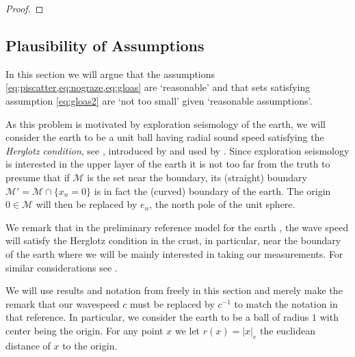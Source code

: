 \documentclass[
	fontsize=11pt, 
	twoside=false, 
	abstract=true, 
	a4paper,
]{scrartcl}
\newcommand{\dd}{\mathrm{d}}
\newcommand{\abs}[1]{\left\lvert#1\right\rvert}
\newcommand{\td}[1]{\tilde{#1}}
\begin{document}
\begin{proof}
%
%
%
\end{proof}

\subsection{Plausibility of Assumptions}\label{sec:phys}

In this section we will argue that the assumptions \cref{eq:piscatter,eq:nograze,eq:gloas} are `reasonable' and that sets satisfying assumption \cref{eq:gloas2} are `not too small' given `reasonable assumptions'.

As this problem is motivated by exploration seismology of the earth, we will consider the earth to be a unit ball having radial sound speed satisfying the \emph{Herglotz condition}, see \cite[\S~2]{zbMATH07625517}, introduced by \cite{zbMATH02652337} and used by \cite{zbMATH02645973}. Since exploration seismology is interested in the upper layer of the earth it is not too far from the truth to presume that if $\mathcal{M}$ is the set near the boundary, its (straight) boundary $\mathcal{M}' = \mathcal{M}\cap \{x_n=0\}$ is in fact the (curved) boundary of the earth. The origin $0 \in \mathcal{M}$ will then be replaced by $e_n$, the north pole of the unit sphere.

We remark that in the preliminary reference model for the earth \cite{DZIEWONSKI1981297}, the wave speed will satisfy the Herglotz condition in the crust, in particular, near the boundary of the earth where we will be mainly interested in taking our measurements. For similar considerations see \cite{ilmavirta2023sphericallysymmetricterrestrialplanets}. 

We will use results and notation from \cite[\S~2]{zbMATH07625517} freely in this section and merely make the remark that our wavespeed $c$ must be replaced by $c^{-1}$ to match the notation in that reference. In particular, we consider the earth to be a ball of radius $1$ with center being the origin. For any point $x$ we let $r(x) = \abs{x}_e$ the euclidean distance of $x$ to the origin.
\end{document}
